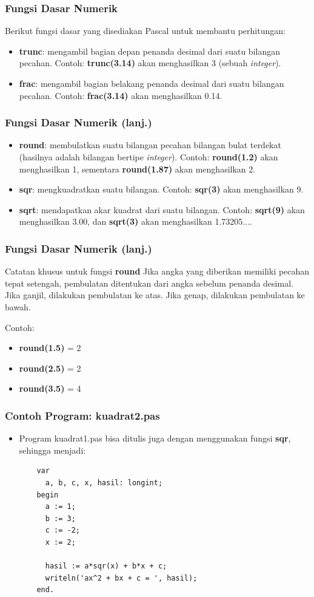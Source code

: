 \begin{frame}
\frametitle{Fungsi Dasar Numerik}
Berikut fungsi dasar yang disediakan Pascal untuk membantu perhitungan:
\begin{itemize}
  \item \textbf{trunc}: mengambil bagian depan penanda desimal dari suatu bilangan pecahan. Contoh: \textbf{trunc(3.14)} akan menghasilkan 3 (sebuah \textit{integer}).
  \item \textbf{frac}: mengambil bagian belakang penanda desimal dari suatu bilangan pecahan. Contoh: \textbf{frac(3.14)} akan menghasilkan 0.14.
\end{itemize}
\end{frame}

\begin{frame}
\frametitle{Fungsi Dasar Numerik (lanj.)}
\begin{itemize}
  \item \textbf{round}: membulatkan suatu bilangan pecahan bilangan bulat terdekat (hasilnya adalah bilangan bertipe \textit{integer}). Contoh: \textbf{round(1.2)} akan menghasilkan 1, sementara \textbf{round(1.87)} akan menghasilkan 2.
  \item \textbf{sqr}: mengkuadratkan suatu bilangan. Contoh: \textbf{sqr(3)} akan menghasilkan 9.
  \item \textbf{sqrt}: mendapatkan akar kuadrat dari suatu bilangan. Contoh: \textbf{sqrt(9)} akan menghasilkan 3.00, dan \textbf{sqrt(3)} akan menghasilkan 1.73205....
\end{itemize}
\end{frame}

\begin{frame}
\frametitle{Fungsi Dasar Numerik (lanj.)}
\begin{block}{Catatan khusus untuk fungsi \textbf{round}}
Jika angka yang diberikan memiliki pecahan tepat setengah, pembulatan ditentukan dari angka sebelum penanda desimal. Jika ganjil, dilakukan pembulatan ke atas. Jika genap, dilakukan pembulatan ke bawah.

Contoh:
\begin{itemize}
\item \textbf{round(1.5)} = 2
\item \textbf{round(2.5)} = 2
\item \textbf{round(3.5)} = 4
\end{itemize}
\end{block}
\end{frame}

\begin{frame}[fragile]
\frametitle{Contoh Program: kuadrat2.pas}
\begin{itemize}
  \item Program kuadrat1.pas bisa ditulis juga dengan menggunakan fungsi \textbf{sqr}, sehingga menjadi:
  \begin{lstlisting}
    var
      a, b, c, x, hasil: longint;
    begin
      a := 1;
      b := 3;
      c := -2;
      x := 2;

      hasil := a*sqr(x) + b*x + c;
      writeln('ax^2 + bx + c = ', hasil);
    end.
  \end{lstlisting}
\end{itemize}
\end{frame}

